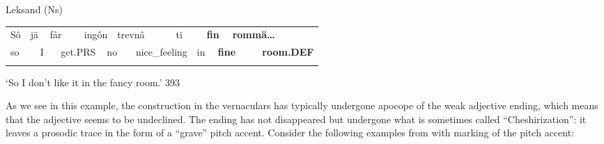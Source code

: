 \begin{listWWNumileveli}
\item 

\begin{styleExample}
\label{bkm:Ref140985874}Leksand (Ns)

\end{styleExample}

\end{listWWNumileveli}

\begin{tabular}{llllllllllllllll}
\lsptoprule
Sô & \multicolumn{2}{l}{jä

} & \multicolumn{2}{l}{får

} & \multicolumn{2}{l}{ingôn

} & \multicolumn{2}{l}{trevnâ

} & \multicolumn{2}{l}{ti

} & \multicolumn{2}{l}{{\bfseries fin}

} & \multicolumn{2}{l}{{\bfseries rommä…}

} & \\
\multicolumn{2}{l}{so

} & \multicolumn{2}{l}{I

} & \multicolumn{2}{l}{get.PRS

} & \multicolumn{2}{l}{no

} & \multicolumn{2}{l}{nice\_feeling

} & \multicolumn{2}{l}{in

} & \multicolumn{2}{l}{{\bfseries fine}

} & \multicolumn{2}{l}{{\bfseries room.DEF}

}\\
\lspbottomrule
\end{tabular}

\begin{styleTranslation}
‘So I don’t like it in the fancy room.’ 393

\end{styleTranslation}

\begin{styleBodyTextFirst}
As we see in this example, the construction in the vernaculars has typically undergone apocope of the weak adjective ending, which means that the adjective seems to be undeclined. The ending has not disappeared but undergone what is sometimes called “Cheshirization”: it leaves a prosodic trace in the form of a “grave” pitch accent. Consider the following examples from \citet[148]{Levander1928} with marking of the pitch accent:

\end{styleBodyTextFirst}

